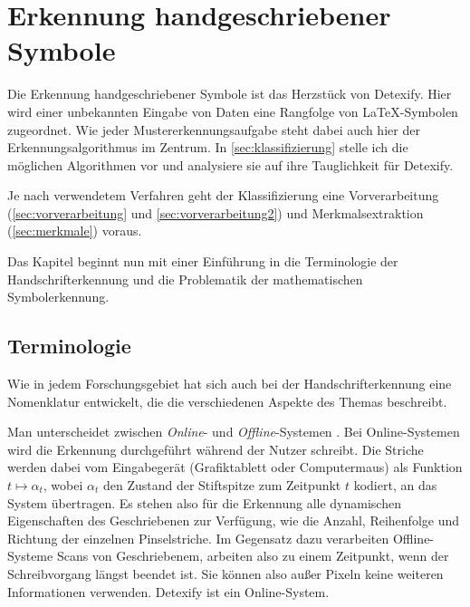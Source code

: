 

\chapter{Erkennung handgeschriebener Symbole}

\label{cha:erkennung}

Die Erkennung handgeschriebener Symbole ist das Herzstück von Detexify. Hier wird einer unbekannten Eingabe von Daten eine Rangfolge von \LaTeX-Symbolen zugeordnet. Wie jeder Mustererkennungsaufgabe steht dabei auch hier der Erkennungsalgorithmus im Zentrum. In \ref{sec:klassifizierung} stelle ich die möglichen Algorithmen vor und analysiere sie auf ihre Tauglichkeit für Detexify.

Je nach verwendetem Verfahren geht der Klassifizierung eine Vorverarbeitung (\ref{sec:vorverarbeitung} und \ref{sec:vorverarbeitung2}) und Merkmalsextraktion (\ref{sec:merkmale}) voraus.

Das Kapitel beginnt nun mit einer Einführung in die Terminologie der Handschrifterkennung und die Problematik der mathematischen Symbolerkennung.

\section{Terminologie}

\label{sec:terminologie}

Wie in jedem Forschungsgebiet hat sich auch bei der Handschrifterkennung eine Nomenklatur entwickelt, die die verschiedenen Aspekte des Themas beschreibt.

Man unterscheidet zwischen \emph{Online}- und \emph{Offline}-Systemen \cite{Tappert:1990p10302}. Bei Online-Systemen wird die Erkennung durchgeführt während der Nutzer schreibt. Die Striche werden dabei vom Eingabegerät (Grafiktablett oder Computermaus) als Funktion \( t \mapsto \alpha_t \), wobei \( \alpha_t \) den Zustand der Stiftspitze zum Zeitpunkt $t$ kodiert, an das System übertragen. Es stehen also für die Erkennung alle dynamischen Eigenschaften des Geschriebenen zur Verfügung, wie die Anzahl, Reihenfolge und Richtung der einzelnen Pinselstriche. Im Gegensatz dazu verarbeiten Offline-Systeme Scans von Geschriebenem, arbeiten also zu einem Zeitpunkt, wenn der Schreibvorgang längst beendet ist. Sie können also außer Pixeln keine weiteren Informationen verwenden. Detexify ist ein Online-System.

